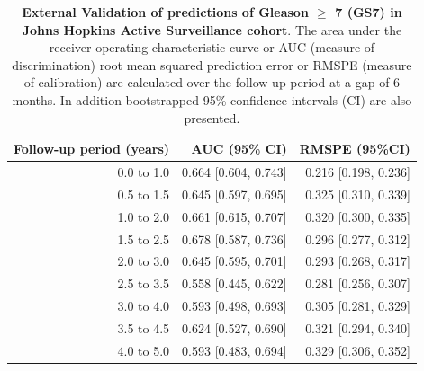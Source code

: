 \begin{table}[!htb]
\small\sf\centering
\caption{\textbf{External Validation of predictions of Gleason $\geq$ 7 (GS7) in Johns Hopkins Active Surveillance cohort}. The area under the receiver operating characteristic curve or AUC (measure of discrimination) root mean squared prediction error or RMSPE (measure of calibration) are calculated over the follow-up period at a gap of 6 months. In addition bootstrapped 95\% confidence intervals (CI) are also presented.}
\label{tab:AUC_PE_JHAS}
\begin{tabular}{r|r|r}
\hline
\hline
Follow-up period (years) & AUC (95\% CI) & RMSPE (95\%CI)\\ 
\hline
0.0 to 1.0 & 0.664 [0.604, 0.743] & 0.216 [0.198, 0.236]\\
0.5 to 1.5 & 0.645 [0.597, 0.695] & 0.325 [0.310, 0.339]\\
1.0 to 2.0 & 0.661 [0.615, 0.707] & 0.320 [0.300, 0.335]\\
1.5 to 2.5 & 0.678 [0.587, 0.736] & 0.296 [0.277, 0.312]\\
2.0 to 3.0 & 0.645 [0.595, 0.701] & 0.293 [0.268, 0.317]\\
2.5 to 3.5 & 0.558 [0.445, 0.622] & 0.281 [0.256, 0.307]\\
3.0 to 4.0 & 0.593 [0.498, 0.693] & 0.305 [0.281, 0.329]\\
3.5 to 4.5 & 0.624 [0.527, 0.690] & 0.321 [0.294, 0.340]\\
4.0 to 5.0 & 0.593 [0.483, 0.694] & 0.329 [0.306, 0.352]\\
\hline
\end{tabular}	
\end{table}

